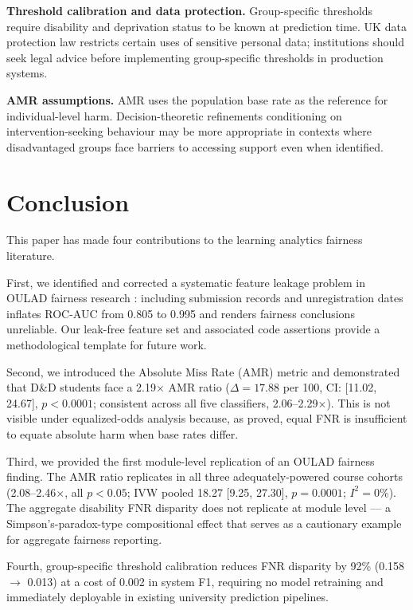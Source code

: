\documentclass[12pt,a4paper]{article}
\begin{document}
\textbf{Threshold calibration and data protection.} Group-specific thresholds
require disability and deprivation status to be known at prediction time. UK
data protection law restricts certain uses of sensitive personal data;
institutions should seek legal advice before implementing group-specific
thresholds in production systems.

\textbf{AMR assumptions.} AMR uses the population base rate as the reference
for individual-level harm. Decision-theoretic refinements conditioning on
intervention-seeking behaviour may be more appropriate in contexts where
disadvantaged groups face barriers to accessing support even when identified.

\section{Conclusion}

This paper has made four contributions to the learning analytics fairness
literature.

First, we identified and corrected a systematic feature leakage problem in
OULAD fairness research \citep{kaufman2012}: including submission records and
unregistration dates inflates ROC-AUC from 0.805 to 0.995 and renders
fairness conclusions unreliable. Our leak-free feature set and associated code
assertions provide a methodological template for future work.

Second, we introduced the Absolute Miss Rate (AMR) metric and demonstrated
that D\&D students face a 2.19$\times$ AMR ratio ($\Delta = 17.88$ per 100,
CI: [11.02, 24.67], $p < 0.0001$; consistent across all five classifiers,
2.06--2.29$\times$). This is not visible under equalized-odds analysis because,
as \citet{chouldechova2017} proved, equal FNR is insufficient to equate
absolute harm when base rates differ.

Third, we provided the first module-level replication of an OULAD fairness
finding. The AMR ratio replicates in all three adequately-powered course
cohorts (2.08--2.46$\times$, all $p < 0.05$; IVW pooled 18.27 [9.25, 27.30],
$p = 0.0001$; $I^2 = 0\%$). The aggregate disability FNR disparity does not
replicate at module level --- a Simpson's-paradox-type compositional effect
\citep{simpson1951} that serves as a cautionary example for aggregate fairness
reporting.

Fourth, group-specific threshold calibration reduces FNR disparity by 92\%
(0.158 $\rightarrow$ 0.013) at a cost of 0.002 in system F1, requiring no
model retraining \citep{hardt2016} and immediately deployable in existing
university prediction pipelines.
\end{document}
